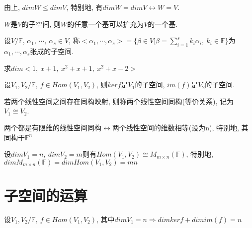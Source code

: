 \begin{property}
    由上, $dimW \le dimV$, 特别地, 有$dimW = dimV \leftrightarrow W = V$.
\end{property}

\begin{theorem}[基的扩充定理]
    $W$是$V$的子空间, 则$W$的任意一个基可以扩充为$V$的一个基.
\end{theorem}

\begin{definition}[生成子空间]
    设$V/\mathbb{F}$, $\alpha{_1}, \ \cdots, \ \alpha{_s} \in V$, 称$<\alpha{_1}, \cdots, \alpha{_s}>=\{\beta \in V|\beta=\sum^s_{i=1}k_i\alpha{_i}, \ k_i \in \mathbb{F}\}$为$\alpha{_1}, \cdots, \alpha{_s}$张成的子空间.
\end{definition}

\begin{example}
    求$dim<1, \ x+1, \ x^2+x+1, \ x^2+x-2>$
\end{example}

\begin{example}
    设$V_1,V_2/\mathbb{F}, \ f \in Hom(V_1, V_2)$, 则$kerf$是$V_1$的子空间, $im(f)$是$V_2$的子空间.
\end{example}

\begin{definition}[同构]
    若两个线性空间之间存在同构映射, 则称两个线性空间同构(等价关系), 记为$V_1 \cong V_2$.
\end{definition}

\begin{theorem}[同构定理]
    两个都是有限维的线性空间同构$\longleftrightarrow$两个线性空间的维数相等(设为n), 特别地, 其同构于$\mathbb{F}^n$
\end{theorem}

\begin{example}
    设$dimV_1 = n,\ dimV_2 = m$则有$Hom(V_1, V_2)\cong M_{m\times n}(\mathbb{F})$, 特别地, $dimM_{m\times n}(\mathbb{F})=dimHom(V_1, V_2)=mn$
\end{example}

\section{ 子空间的运算 }

\begin{theorem}[子空间的维数公式]
    设$V_1, V_2/\mathbb{F}, \ f\in Hom(V_1, V_2)$, 其中$dimV_1=n$$\Longrightarrow$$dimkerf + dimim(f) = n$
\end{theorem}

